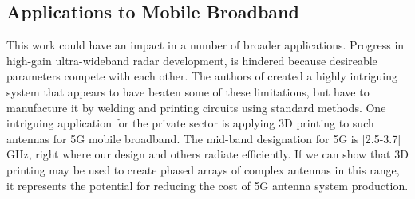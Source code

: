 \documentclass[../../../main.tex]{subfiles}
\begin{document}
\subsection{Applications to Mobile Broadband}
\label{sec:applications}

This work could have an impact in a number of broader applications.  Progress in high-gain ultra-wideband radar development, is hindered because desireable parameters compete with each other.  The authors of \cite{10.3390/electronics10121377} created a highly intriguing system that appears to have beaten some of these limitations, but have to manufacture it by welding and printing circuits using standard methods.  One intriguing application for the private sector is applying 3D printing to such antennas for 5G mobile broadband.  The mid-band designation for 5G is [2.5-3.7] GHz, right where our design and others radiate efficiently.  If we can show that 3D printing may be used to create phased arrays of complex antennas in this range, it represents the potential for reducing the cost of 5G antenna system production.
\end{document}
